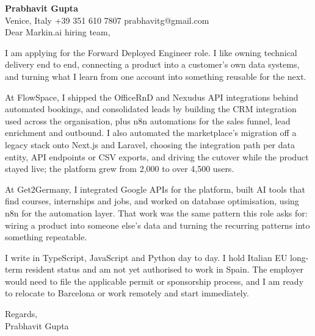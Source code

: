 \documentclass[a4paper,10.5pt]{article}
\begin{document}
\textbf{Prabhavit Gupta}\\
Venice, Italy \textbar{} +39 351 610 7807 \textbar{} prabhavitg@gmail.com\\[10pt]
Dear Markin.ai hiring team,

I am applying for the Forward Deployed Engineer role. I like owning technical delivery end to end, connecting a product into a customer's own data systems, and turning what I learn from one account into something reusable for the next.

At FlowSpace, I shipped the OfficeRnD and Nexudus API integrations behind automated bookings, and consolidated leads by building the CRM integration used across the organisation, plus n8n automations for the sales funnel, lead enrichment and outbound. I also automated the marketplace's migration off a legacy stack onto Next.js and Laravel, choosing the integration path per data entity, API endpoints or CSV exports, and driving the cutover while the product stayed live; the platform grew from 2,000 to over 4,500 users.

At Get2Germany, I integrated Google APIs for the platform, built AI tools that find courses, internships and jobs, and worked on database optimisation, using n8n for the automation layer. That work was the same pattern this role asks for: wiring a product into someone else's data and turning the recurring patterns into something repeatable.

I write in TypeScript, JavaScript and Python day to day. I hold Italian EU long-term resident status and am not yet authorised to work in Spain. The employer would need to file the applicable permit or sponsorship process, and I am ready to relocate to Barcelona or work remotely and start immediately.

Regards,\\
Prabhavit Gupta
\end{document}
